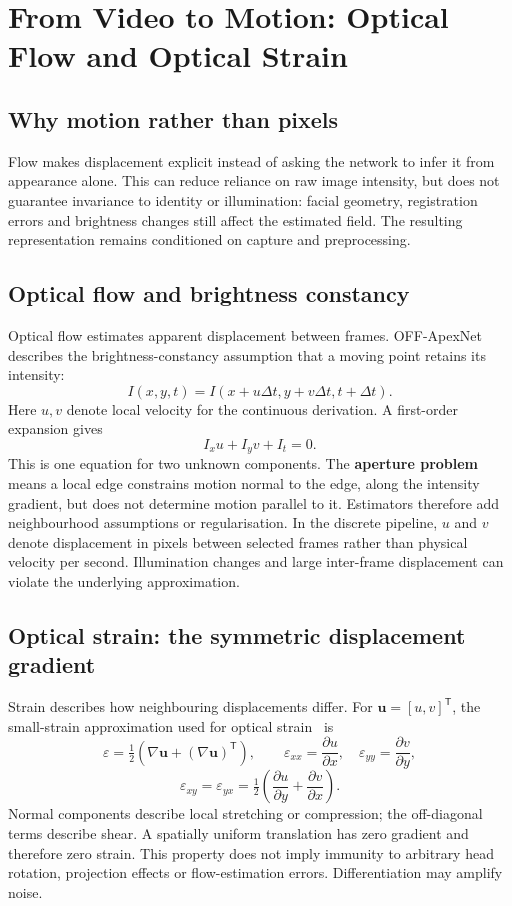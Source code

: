 \section{From Video to Motion: Optical Flow and Optical Strain}
\label{sec:video-to-motion}

\subsection{Why motion rather than pixels}
\label{sec:why-motion}

Flow makes displacement explicit instead of asking the network to infer it from appearance alone. This can reduce reliance on raw image intensity, but does not guarantee invariance to identity or illumination: facial geometry, registration errors and brightness changes still affect the estimated field. The resulting representation remains conditioned on capture and preprocessing.

\subsection{Optical flow and brightness constancy}
\label{sec:optical-flow}

Optical flow estimates apparent displacement between frames. OFF-ApexNet~\cite{liong2019a} describes the brightness-constancy assumption that a moving point retains its intensity:
\[
    I(x,y,t)=I(x+u\Delta t,y+v\Delta t,t+\Delta t).
\]
Here $u,v$ denote local velocity for the continuous derivation. A first-order expansion gives
\[
    I_xu+I_yv+I_t=0.
\]
This is one equation for two unknown components. The \textbf{aperture problem} means a local edge constrains motion normal to the edge, along the intensity gradient, but does not determine motion parallel to it. Estimators therefore add neighbourhood assumptions or regularisation. In the discrete pipeline, $u$ and $v$ denote displacement in pixels between selected frames rather than physical velocity per second. Illumination changes and large inter-frame displacement can violate the underlying approximation.

\subsection{Optical strain: the symmetric displacement gradient}
\label{sec:optical-strain}

Strain describes how neighbouring displacements differ. For $\mathbf{u}=[u,v]^{\mathsf T}$, the small-strain approximation used for optical strain~\cite{shreve2011} is
\[
    \varepsilon=\tfrac12\left(\nabla\mathbf{u}
                         +(\nabla\mathbf{u})^{\mathsf T}\right),
    \qquad
    \varepsilon_{xx}=\frac{\partial u}{\partial x},\quad
    \varepsilon_{yy}=\frac{\partial v}{\partial y},
\]
\[
    \varepsilon_{xy}=\varepsilon_{yx}
       =\tfrac12\left(\frac{\partial u}{\partial y}
                    +\frac{\partial v}{\partial x}\right).
\]
Normal components describe local stretching or compression; the off-diagonal terms describe shear. A spatially uniform translation has zero gradient and therefore zero strain. This property does not imply immunity to arbitrary head rotation, projection effects or flow-estimation errors. Differentiation may amplify noise.

